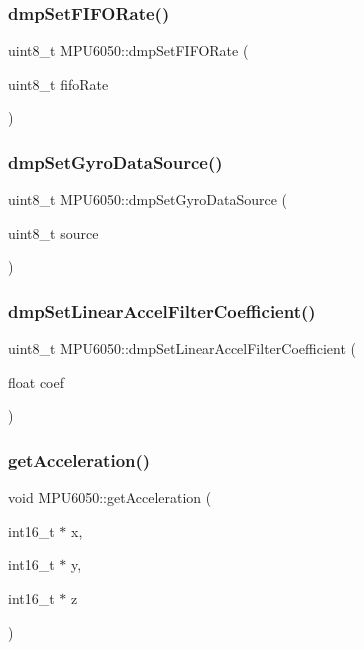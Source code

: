 \subsubsection{\texorpdfstring{dmpSetFIFORate()}{dmpSetFIFORate()}}
{\footnotesize\ttfamily uint8\+\_\+t M\+P\+U6050\+::dmp\+Set\+F\+I\+F\+O\+Rate (\begin{DoxyParamCaption}\item[{uint8\+\_\+t}]{fifo\+Rate }\end{DoxyParamCaption})}

\mbox{\label{classMPU6050_a235b9911e8fc8b3674cc9ffcfa03e107}} 
\subsubsection{\texorpdfstring{dmpSetGyroDataSource()}{dmpSetGyroDataSource()}}
{\footnotesize\ttfamily uint8\+\_\+t M\+P\+U6050\+::dmp\+Set\+Gyro\+Data\+Source (\begin{DoxyParamCaption}\item[{uint8\+\_\+t}]{source }\end{DoxyParamCaption})}

\mbox{\label{classMPU6050_a7142bff552ab1e980cba38f97772eecd}} 
\subsubsection{\texorpdfstring{dmpSetLinearAccelFilterCoefficient()}{dmpSetLinearAccelFilterCoefficient()}}
{\footnotesize\ttfamily uint8\+\_\+t M\+P\+U6050\+::dmp\+Set\+Linear\+Accel\+Filter\+Coefficient (\begin{DoxyParamCaption}\item[{float}]{coef }\end{DoxyParamCaption})}

\mbox{\label{classMPU6050_a658dfc7e35b7fdba360a75f137bde33a}} 
\subsubsection{\texorpdfstring{getAcceleration()}{getAcceleration()}}
{\footnotesize\ttfamily void M\+P\+U6050\+::get\+Acceleration (\begin{DoxyParamCaption}\item[{int16\+\_\+t $\ast$}]{x,  }\item[{int16\+\_\+t $\ast$}]{y,  }\item[{int16\+\_\+t $\ast$}]{z }\end{DoxyParamCaption})}

